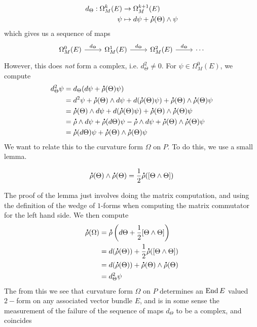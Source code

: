 %
\begin{align*}
d_\Theta : \Omega^k_M(E) &\to \Omega^{k+1}_M(E) \\
\psi &\mapsto d\psi + \accentset{\mbox{\large\bfseries .}}{\rho}(\Theta) \wedge \psi
\end{align*}
%
which gives us a sequence of maps
\[\begin{tikzcd}
\Omega^0_M(E) \ar[r, "d_\Theta"] & \Omega^1_M(E) \ar[r, "d_\Theta"]
& \Omega^2_M(E) \ar[r, "d_\Theta"]  & \cdots
\end{tikzcd}\]
However, this does \emph{not} form a complex, i.e. $d_\Theta^2 \neq 0$. For
$\psi \in \Omega^0_M(E)$, we compute
%
\begin{align*}
d_\Theta^2\psi &= d_\Theta(d\psi + \accentset{\mbox{\large\bfseries .}}{\rho}(\Theta)\psi) \\
&= d^2\psi + \accentset{\mbox{\large\bfseries .}}{\rho}(\Theta) \wedge d\psi + d(\accentset{\mbox{\large\bfseries .}}{\rho}(\Theta)\psi)
+ \accentset{\mbox{\large\bfseries .}}{\rho}(\Theta) \wedge \accentset{\mbox{\large\bfseries .}}{\rho}(\Theta)\psi \\
&= \accentset{\mbox{\large\bfseries .}}{\rho}(\Theta) \wedge d\psi + d(\accentset{\mbox{\large\bfseries .}}{\rho}(\Theta)\psi)
+ \accentset{\mbox{\large\bfseries .}}{\rho}(\Theta) \wedge \accentset{\mbox{\large\bfseries .}}{\rho}(\Theta)\psi \\
&= \accentset{\mbox{\large\bfseries .}}{\rho} \wedge d\psi + \accentset{\mbox{\large\bfseries .}}{\rho}(d\Theta)\psi - \accentset{\mbox{\large\bfseries .}}{\rho} \wedge d\psi
+ \accentset{\mbox{\large\bfseries .}}{\rho}(\Theta) \wedge \accentset{\mbox{\large\bfseries .}}{\rho}(\Theta)\psi \\
&= \accentset{\mbox{\large\bfseries .}}{\rho}(d\Theta)\psi + \accentset{\mbox{\large\bfseries .}}{\rho}(\Theta) \wedge \accentset{\mbox{\large\bfseries .}}{\rho}(\Theta)\psi
\end{align*}
%
We want to relate this to the curvature form $\Omega$ on $P$. To do this, we use a
small lemma.
%
\begin{lem}
\[
\accentset{\mbox{\large\bfseries .}}{\rho}(\Theta) \wedge \accentset{\mbox{\large\bfseries .}}{\rho}(\Theta) = \frac{1}{2}\accentset{\mbox{\large\bfseries .}}{\rho}([\Theta \wedge \Theta])
\]
\end{lem}
%
The proof of the lemma just involves doing the matrix computation, and using the
definition of the wedge of $1$-forms when computing the matrix commutator
for the left hand side. We then compute
\begin{align*}
\accentset{\mbox{\large\bfseries .}}{\rho}(\Omega) &= \accentset{\mbox{\large\bfseries .}}{\rho}\left(d\Theta + \frac{1}{2}[\Theta \wedge \Theta]\right) \\
&= d(\accentset{\mbox{\large\bfseries .}}{\rho}(\Theta)) + \frac{1}{2}\accentset{\mbox{\large\bfseries .}}{\rho}([\Theta \wedge \Theta]) \\
&= d(\accentset{\mbox{\large\bfseries .}}{\rho}(\Theta)) + \accentset{\mbox{\large\bfseries .}}{\rho}(\Theta) \wedge \accentset{\mbox{\large\bfseries .}}{\rho}(\Theta) \\
&= d^2_\Theta\psi
\end{align*}
%
The from this we see that curvature form $\Omega$ on $P$ determines an $\operatorname{End} E$ valued
$2-$form on any associated vector bundle $E$, and is in some sense the measurement
of the failure of the sequence of maps $d_\Theta$ to be a complex, and coincides
